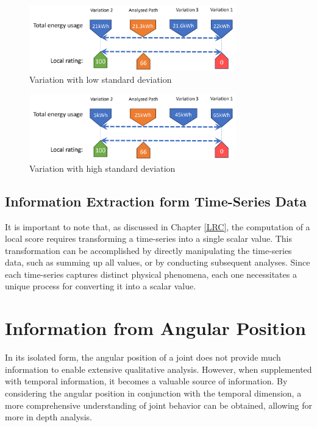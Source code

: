 \begin{figure}[H]
	\centerline{\includegraphics[width=0.8\textwidth]{figures/lowstd.png}}
	\caption{Variation with low standard deviation}
	\label{lowstd}
\end{figure}

\begin{figure}[H]
	\centerline{\includegraphics[width=0.8\textwidth]{figures/highstd.png}}
	\caption{Variation with high standard deviation}
	\label{highstd}
\end{figure}

 
\subsection{Information Extraction form Time-Series Data}\label{extraction}
It is important to note that, as discussed in Chapter \ref{LRC}, the computation of a local score requires transforming a time-series into a single scalar value. This transformation can be accomplished by directly manipulating the time-series data, such as summing up all values, or by conducting subsequent analyses. Since each time-series captures distinct physical phenomena, each one necessitates a unique process for converting it into a scalar value.




\newpage
\section{Information from Angular Position}
In its isolated form, the angular position of a joint does not provide much information to enable extensive qualitative analysis. However, when supplemented with temporal information, it becomes a valuable source of information. By considering the angular position in conjunction with the temporal dimension, a more comprehensive understanding of joint behavior can be obtained, allowing for more in depth analysis.



